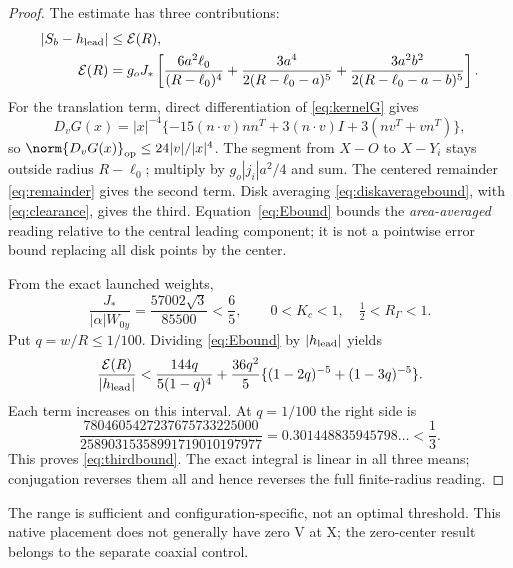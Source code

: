 \begin{proof}
The estimate has three contributions:
\begin{align}
|S_b-h_{\rm lead}|&\le\mathcal E(R),\label{eq:Ebound}\\
\mathcal E(R)&=g_oJ_*\left[
\frac{6a^2\ell_0}{(R-\ell_0)^4}
+\frac{3a^4}{2(R-\ell_0-a)^5}
+\frac{3a^2b^2}{2(R-\ell_0-a-b)^5}
\right].\notag
\end{align}
For the translation term, direct differentiation of \eqref{eq:kernelG} gives
\begin{equation}\label{eq:DG}
D_vG(x)=|x|^{-4}
\{-15(n\cdot v)nn^T+3(n\cdot v)I+3(nv^T+vn^T)\},
\end{equation}
so \(\norm{D_vG(x)}_{\rm op}\le24|v|/|x|^4\). The segment from \(X-O\) to \(X-Y_i\) stays outside radius \(R-\ell_0\); multiply by \(g_o|j_i|a^2/4\) and sum. The centered remainder \eqref{eq:remainder} gives the second term. Disk averaging \eqref{eq:diskaveragebound}, with \eqref{eq:clearance}, gives the third. Equation~\eqref{eq:Ebound} bounds the \emph{area-averaged} reading relative to the central leading component; it is not a pointwise error bound replacing all disk points by the center.

From the exact launched weights,
\begin{equation}\label{eq:Jratio}
\frac{J_*}{|\alpha|W_{0y}}=\frac{57002\sqrt3}{85500}<\frac65,\qquad
0<K_c<1,\quad \tfrac12<R_\Gamma<1.
\end{equation}
Put \(q=w/R\le1/100\). Dividing \eqref{eq:Ebound} by \(|h_{\rm lead}|\) yields
\begin{equation}\label{eq:rationalbound}
\frac{\mathcal E(R)}{|h_{\rm lead}|}<
\frac{144q}{5(1-q)^4}
+\frac{36q^2}{5}\{(1-2q)^{-5}+(1-3q)^{-5}\}.
\end{equation}
Each term increases on this interval. At \(q=1/100\) the right side is
\begin{equation}\label{eq:rationalvalue}
\frac{7804605427237675733225000}{25890315358991719010197977}
=0.301448835945798\ldots<\frac13.
\end{equation}
This proves \eqref{eq:thirdbound}. The exact integral is linear in all three means; conjugation reverses them all and hence reverses the full finite-radius reading.
\end{proof}
The range is sufficient and configuration-specific, not an optimal threshold. This native placement does not generally have zero V at X; the zero-center result belongs to the separate coaxial control.

